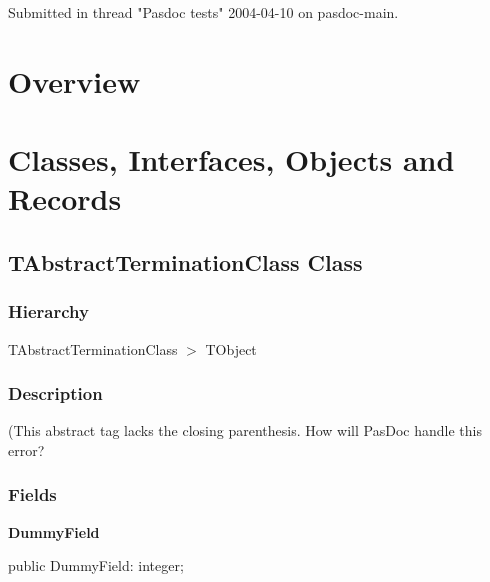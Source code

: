 \documentclass{report}
\newif\ifpdf
\begin{document}
Submitted in thread "Pasdoc tests" 2004{-}04{-}10 on pasdoc{-}main.
\section{Overview}
\begin{description}
\item[\texttt{\begin{ttfamily}TAbstractTerminationClass\end{ttfamily} Class}]
\end{description}
\section{Classes, Interfaces, Objects and Records}
\ifpdf
\subsection*{\large{\textbf{TAbstractTerminationClass Class}}\normalsize\hspace{1ex}\hrulefill}
\else
\subsection*{TAbstractTerminationClass Class}
\fi
\label{warning_abstract_termination.TAbstractTerminationClass}
\subsubsection*{\large{\textbf{Hierarchy}}\normalsize\hspace{1ex}\hfill}
TAbstractTerminationClass {$>$} TObject
\subsubsection*{\large{\textbf{Description}}\normalsize\hspace{1ex}\hfill}
(This abstract tag lacks the closing parenthesis. How will PasDoc handle this error?\subsubsection*{\large{\textbf{Fields}}\normalsize\hspace{1ex}\hfill}
\begin{list}{}{
\setlength{\itemindent}{0cm}
\setlength{\listparindent}{0cm}
\setlength{\leftmargin}{\evensidemargin}
\addtolength{\leftmargin}{\tmplength}
\settowidth{\labelsep}{X}
\addtolength{\leftmargin}{\labelsep}
\setlength{\labelwidth}{\tmplength}
}
\label{warning_abstract_termination.TAbstractTerminationClass-DummyField}
\item[\textbf{DummyField}\hfill]
\ifpdf
\begin{flushleft}
\fi
\begin{ttfamily}
public DummyField: integer;\end{ttfamily}

\ifpdf
\end{flushleft}
\fi


\par  \end{list}
\end{document}
